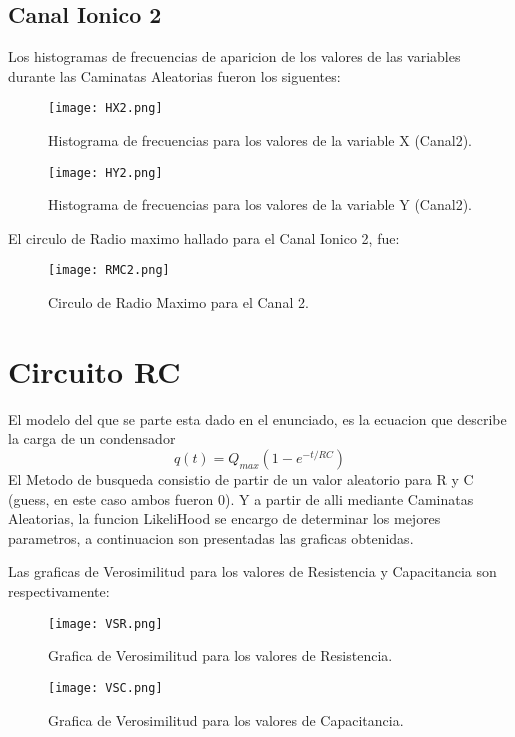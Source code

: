\documentclass[9pt]{article}
\begin{document}
\subsection{Canal Ionico 2}
Los histogramas de frecuencias de aparicion de los valores de las variables durante las Caminatas Aleatorias fueron los siguentes:
	\begin{figure}[h]
		\centering
			\texttt{[image: HX2.png]}
		\caption{Histograma de frecuencias para los valores de la variable X (Canal2).}
		\label{fig:HX2}
	\end{figure}

	\begin{figure}
		\centering
			\texttt{[image: HY2.png]}
		\caption{Histograma de frecuencias para los valores de la variable Y (Canal2).}
		\label{fig:HY2}
	\end{figure}

El circulo de Radio maximo hallado para el Canal Ionico 2, fue:
	\begin{figure}[h]
		\centering
			\texttt{[image: RMC2.png]}
		\caption{Circulo de Radio Maximo para el Canal 2.}
		\label{fig:RMC2}
	\end{figure}


\section{Circuito RC}
El modelo del que se parte esta dado en el enunciado, es la ecuacion que describe la carga de un condensador 
$$ 
q(t) = Q_{max}(1-e^{-t/RC}) 
$$
El Metodo de busqueda consistio de partir de un valor aleatorio para R y C (guess, en este caso ambos fueron 0). Y a partir de alli mediante Caminatas Aleatorias, la funcion LikeliHood se encargo de determinar los mejores parametros, a continuacion son presentadas las graficas obtenidas.

Las graficas de Verosimilitud para los valores de Resistencia y Capacitancia son respectivamente:
	\begin{figure}
		\centering
			\texttt{[image: VSR.png]}
		\caption{Grafica de Verosimilitud para los valores de Resistencia.}
		\label{fig:VSR}
	\end{figure}

	\begin{figure}
		\centering
			\texttt{[image: VSC.png]}
		\caption{Grafica de Verosimilitud para los valores de Capacitancia.}
		\label{fig:VSC}
	\end{figure}
\end{document}

